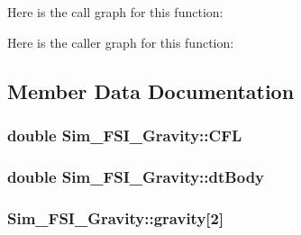 Here is the call graph for this function\+:




Here is the caller graph for this function\+:




\subsection{Member Data Documentation}
\hypertarget{class_sim___f_s_i___gravity_ac73b8e37488e3f55a67d3b62eb4a98bf}{}
\subsubsection[{C\+F\+L}]{\setlength{\rightskip}{0pt plus 5cm}double Sim\+\_\+\+F\+S\+I\+\_\+\+Gravity\+::\+C\+F\+L\hspace{0.3cm}{\ttfamily [protected]}}\label{class_sim___f_s_i___gravity_ac73b8e37488e3f55a67d3b62eb4a98bf}
\hypertarget{class_sim___f_s_i___gravity_aa5eb5526dc487939dc0ef241e904481c}{}
\subsubsection[{dt\+Body}]{\setlength{\rightskip}{0pt plus 5cm}double Sim\+\_\+\+F\+S\+I\+\_\+\+Gravity\+::dt\+Body\hspace{0.3cm}{\ttfamily [protected]}}\label{class_sim___f_s_i___gravity_aa5eb5526dc487939dc0ef241e904481c}
\hypertarget{class_sim___f_s_i___gravity_a4056a32c94c0375219f3248e29df7535}{}
\subsubsection[{gravity}]{ Sim\+\_\+\+F\+S\+I\+\_\+\+Gravity\+::gravity\mbox{[}2\mbox{]}\hspace{0.3cm}{\ttfamily [protected]}}\label{class_sim___f_s_i___gravity_a4056a32c94c0375219f3248e29df7535}
\hypertarget{class_sim___f_s_i___gravity_a29e377488239d27f0a112ce9e4bf1e97}{}
